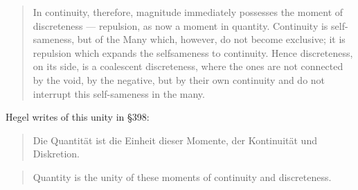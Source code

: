 \documentclass{article}
\begin{document}
\begin{quote}
    In continuity, therefore, magnitude immediately possesses the moment of discreteness — repulsion,
as now a moment in quantity. Continuity is self-sameness, but of the Many which, however, do not become
exclusive; it is repulsion which expands the selfsameness to continuity. Hence discreteness, on its side,
is a coalescent discreteness, where the ones are not connected by the void, by the negative, but by their
own continuity and do not interrupt this self-sameness in the many.
\end{quote}

Hegel writes of this unity in §398:

\begin{quote}
    Die Quantität ist die Einheit dieser Momente, der Kontinuität und Diskretion.
\end{quote}

\begin{quote}
    Quantity is the unity of these moments of continuity and discreteness.
\end{quote}
\end{document}
